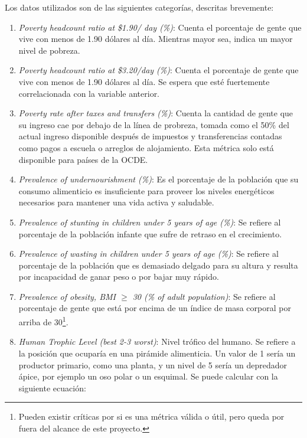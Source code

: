 \documentclass[a4paper,12pt]{amsart}
\begin{document}
    Los datos utilizados son de las siguientes categorías, descritas brevemente:
    \begin{enumerate}
        \item \emph{Poverty headcount ratio at \$1.90/ day (\%)}: Cuenta el porcentaje de gente que vive con menos de 1.90 dólares al día. Mientras mayor sea, indica un mayor nivel de pobreza.
        \item \emph{Poverty headcount ratio at \$3.20/day (\%)}: Cuenta el porcentaje de gente que vive con menos de 1.90 dólares al día. Se espera que esté fuertemente correlacionada con la variable anterior.
        \item \emph{Poverty rate after taxes and transfers (\%)}: Cuenta la cantidad de gente que su ingreso cae por debajo de la línea de probreza, tomada como el 50\% del actual ingreso disponible después de impuestos y transferencias contadas como pagos a escuela o arreglos de alojamiento. Esta métrica solo está disponible para países de la OCDE. \cite{noauthor_income_nodate} 
        \item \emph{Prevalence of undernourishment (\%)}: Es el porcentaje de la población que su consumo alimenticio es insuficiente para proveer los niveles energéticos necesarios para mantener una vida activa y saludable.
        \item \emph{Prevalence of stunting in children under 5 years of age (\%)}: Se refiere al porcentaje de la población infante que sufre de retraso en el crecimiento.
        \item \emph{Prevalence of wasting in children under 5 years of age (\%)}: Se refiere al porcentaje de la población que es demasiado delgado para su altura y resulta por incapacidad de ganar peso o por bajar muy rápido.
        \item \emph{Prevalence of obesity, BMI $\ge$ 30 (\% of adult population)}: Se refiere al porcentaje de gente que está por encima de un índice de masa corporal por arriba de 30\footnote{Pueden existir críticas por si es una métrica válida o útil, pero queda por fuera del alcance de este proyecto.}.
        \item \emph{Human Trophic Level (best 2-3 worst)}: Nivel trófico del humano. Se refiere a la posición que ocuparía en una pirámide alimenticia. Un valor de 1 sería un productor primario, como una planta, y un nivel de 5 sería un depredador ápice, por ejemplo un oso polar o un esquimal. Se puede calcular con la siguiente ecuación\cite{bonhommeau_eating_2013}: 
        \begin{equation}

\end{equation}
\end{enumerate}
\end{document}
